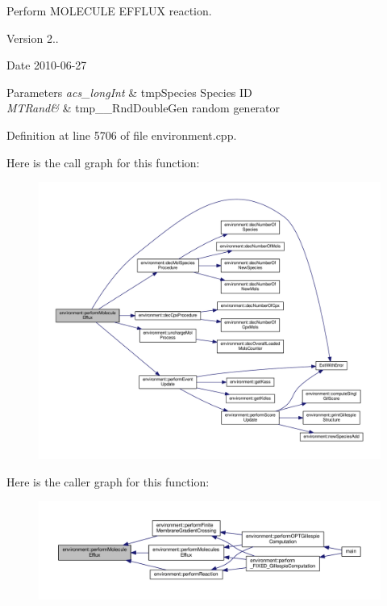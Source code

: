 Perform M\-O\-L\-E\-C\-U\-L\-E E\-F\-F\-L\-U\-X reaction. 

\begin{DoxyVersion}{Version}
2.. 
\end{DoxyVersion}
\begin{DoxyDate}{Date}
2010-\/06-\/27 
\end{DoxyDate}

\begin{DoxyParams}{Parameters}
{\em acs\-\_\-long\-Int} & tmp\-Species Species I\-D \\
\hline
{\em M\-T\-Rand\&} & tmp\-\_\-\-\_\-\-Rnd\-Double\-Gen random generator \\
\hline
\end{DoxyParams}


Definition at line 5706 of file environment.\-cpp.



Here is the call graph for this function\-:\nopagebreak
\begin{figure}[H]
\begin{center}
\leavevmode
\includegraphics[width=350pt]{a00011_ad072a40a7d9521379c7ff50ed8110fbe_cgraph}
\end{center}
\end{figure}




Here is the caller graph for this function\-:\nopagebreak
\begin{figure}[H]
\begin{center}
\leavevmode
\includegraphics[width=350pt]{a00011_ad072a40a7d9521379c7ff50ed8110fbe_icgraph}
\end{center}
\end{figure}



